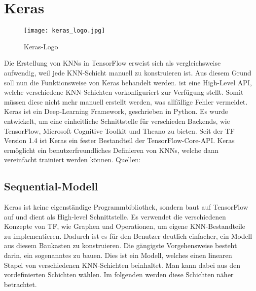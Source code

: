 \section{Keras}
\begin{wrapfigure}{l}{2cm}
  \texttt{[image: keras\_logo.jpg]}
  \caption{Keras-Logo}
\end{wrapfigure}
Die Erstellung von KNNs in TensorFlow erweist sich als vergleichsweise aufwendig, weil jede
KNN-Schicht manuell zu konstruieren ist.  Aus diesem Grund soll nun die
Funktionsweise von Keras behandelt werden.  ist eine High-Level
API, welche verschiedene KNN-Schichten vorkonfiguriert zur Verfügung stellt. Somit müssen diese
nicht mehr manuell erstellt werden, was allfällige Fehler vermeidet.
\para{}
Keras ist ein Deep-Learning Framework, geschrieben in
Python. Es wurde entwickelt, um eine einheitliche Schnittstelle für
verschieden Backends, wie TensorFlow, Microsoft Cognitive Toolkit und Theano zu
bieten. Seit der TF Version 1.4 ist Keras ein fester Bestandteil der TensorFlow-Core-API.
Keras ermöglicht ein benutzerfreundliches Definieren von
KNNs, welche dann vereinfacht trainiert werden können.
\para{}
Quellen: \cite{net:keras_docs} \cite{net:tf_docs}

\subsection{Sequential-Modell}
Keras ist keine eigenständige Programmbibliothek, sondern baut auf
TensorFlow auf und dient als High-level Schnittstelle.
Es verwendet die verschiedenen Konzepte von TF, wie Graphen und Operationen,
um eigene KNN-Bestandteile zu implementieren.
Dadurch ist es für den Benutzer deutlich einfacher, ein Modell aus diesem Baukasten
zu konstruieren.
\para{}
Die gängigste Vorgehensweise besteht darin, ein sogenanntes
 zu bauen.
Dies ist ein Modell, welches einen linearen Stapel von verschiedenen
KNN-Schichten beinhaltet. Man kann dabei aus den vordefinierten Schichten
wählen. Im folgenden werden diese Schichten näher betrachtet.

